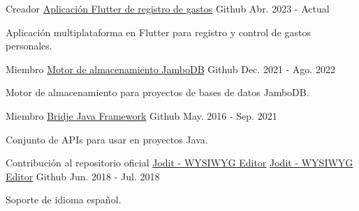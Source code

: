 
\begin{cventries}

  \cventry
    {Creador} %
    {\href{https://github.com/h4j4x/xpenses}{Aplicación Flutter de registro de gastos}} %
    {\faGithubSquare\acvHeaderIconSep Github} %
    {Abr. 2023 - Actual} %
    {
      \begin{cvitems} %
        \item {Aplicación multiplataforma en Flutter para registro y control de gastos personales.}
      \end{cvitems}
    }

  \cventry
    {Miembro} %
    {\href{https://github.com/jambodb/jambodb-storage}{Motor de almacenamiento JamboDB}} %
    {\faGithubSquare\acvHeaderIconSep Github} %
    {Dec. 2021 - Ago. 2022} %
    {
      \begin{cvitems} %
        \item {Motor de almacenamiento para proyectos de bases de datos JamboDB.}
      \end{cvitems}
    }

  \cventry
    {Miembro} %
    {\href{https://github.com/touwolf/bridje-framework}{Bridje Java Framework}} %
    {\faGithubSquare\acvHeaderIconSep Github} %
    {May. 2016 - Sep. 2021} %
    {
      \begin{cvitems} %
        \item {Conjunto de APIs para usar en proyectos Java.}
      \end{cvitems}
    }

  \cventry
    {Contribución al repositorio oficial \href{https://github.com/xdan/jodit}{Jodit - WYSIWYG Editor}} %
    {\href{https://github.com/h4j4x/jodit}{Jodit - WYSIWYG Editor}} %
    {\faGithubSquare\acvHeaderIconSep Github} %
    {Jun. 2018 - Jul. 2018} %
    {
      \begin{cvitems} %
        \item {Soporte de idioma español.}
      \end{cvitems}
    }


\end{cventries}
